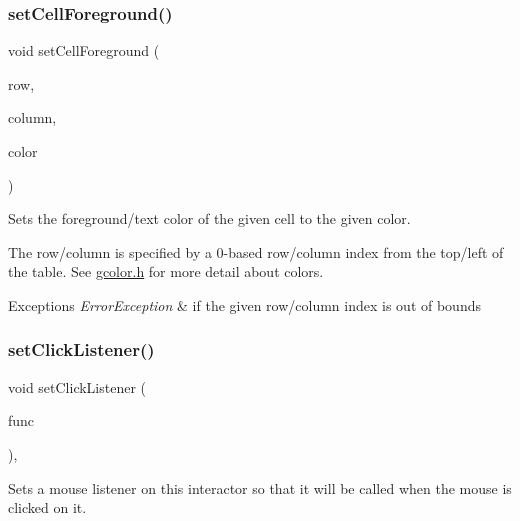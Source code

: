 \subsubsection{\texorpdfstring{set\+Cell\+Foreground()}{setCellForeground()}\hspace{0.1cm}{\footnotesize\ttfamily [2/2]}}
{\footnotesize\ttfamily void set\+Cell\+Foreground (\begin{DoxyParamCaption}\item[{int}]{row,  }\item[{int}]{column,  }\item[{const std\+::string \&}]{color }\end{DoxyParamCaption})\hspace{0.3cm}{\ttfamily [virtual]}}



Sets the foreground/text color of the given cell to the given color. 

The row/column is specified by a 0-\/based row/column index from the top/left of the table. See \mbox{\hyperlink{gcolor_8h_source}{gcolor.\+h}} for more detail about colors. 
\begin{DoxyExceptions}{Exceptions}
{\em Error\+Exception} & if the given row/column index is out of bounds \\
\hline
\end{DoxyExceptions}
\mbox{\label{classsgl_1_1GInteractor_abd40af6921242584d0954f173911b190}} 
\subsubsection{\texorpdfstring{set\+Click\+Listener()}{setClickListener()}\hspace{0.1cm}{\footnotesize\ttfamily [1/2]}}
{\footnotesize\ttfamily void set\+Click\+Listener (\begin{DoxyParamCaption}\item[{\mbox{\hyperlink{namespacesgl_ae9f3e9eab70035da1a2b114e21357b25}{G\+Event\+Listener}}}]{func }\end{DoxyParamCaption})\hspace{0.3cm}{\ttfamily [virtual]}, {\ttfamily [inherited]}}



Sets a mouse listener on this interactor so that it will be called when the mouse is clicked on it. 


